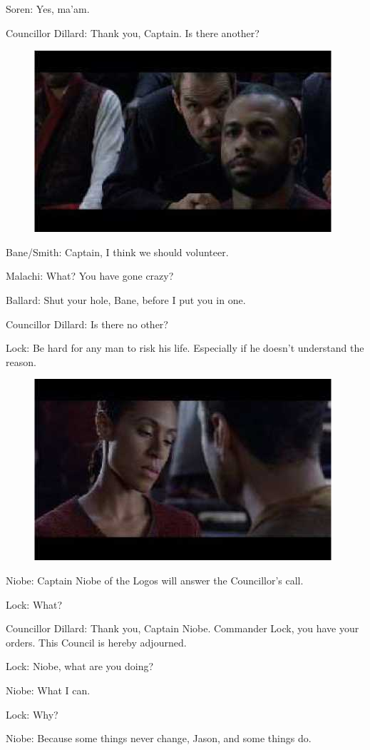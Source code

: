 \documentclass{ctexart}
\newenvironment{myquote}{\color{green} \setlength{\leftskip}{6em} \setlength{\rightskip}{4em} \setlength{\parindent}{-2em}}{\par}
\begin{document}
\begin{myquote}
Soren: Yes, ma'am.

Councillor Dillard: Thank you, Captain. Is there another?

\begin{figure}[htb]
\centering
\includegraphics[width=0.5\linewidth]{fig/read_reloaded-85}
\end{figure}

Bane/Smith: Captain, I think we should volunteer.

Malachi: What? You have gone crazy?

Ballard: Shut your hole, Bane, before I put you in one.

Councillor Dillard: Is there no other?

Lock: Be hard for any man to risk his life. Especially if he doesn't understand the reason.

\begin{figure}[htb]
\centering
\includegraphics[width=0.5\linewidth]{fig/read_reloaded-84}
\end{figure}

Niobe: Captain Niobe of the Logos will answer the Councillor's call.

Lock: What?

Councillor Dillard: Thank you, Captain Niobe. Commander Lock, you have your orders. This Council is hereby adjourned.

Lock: Niobe, what are you doing?

Niobe: What I can.

Lock: Why?

Niobe: Because some things never change, Jason, and some things do.
\end{myquote}
\end{document}
